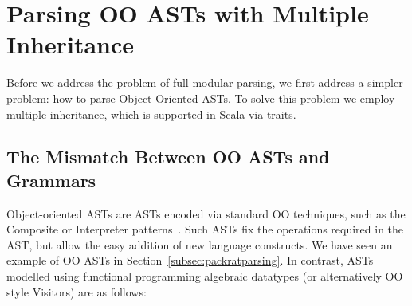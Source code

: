 \begin{comment}
Basically, \name consists of four parts: underlying parsing technique, delegation mechanism encoded by open recursion, Object Algebras, and glue code of new combinators and utility functions. We start from Section \ref{subsec:overview-parsing}, which discusses the choice of parsing technique and how it affects modularity of parsers. Section \ref{subsec:overview-problem} demonstrates the goal of extending parsers together with ASTs in a semantic modular way, with both separate compilation and type-safe code reuse. Then we will see traditional parser combinators fail to achieve it because of hard-coded recursive calls. In Section \ref{subsec:overview-delegation}, we show how delegation can solve this problem and allow us to build extensible parsers. Finally, Section \ref{subsec:overview-oa} gives examples of using Object Algebras for more extensibility, including extension of operations and parsing multiple sorts of syntax.\haoyuan{TODO}
\end{comment}

\begin{comment}
It is worth mentioning that the choice of parser combinators will not
affect the other parts of our library. One can choose other parser
combinators like Parsec, in cases that the performance and supporting
of left-recursion are not major concerns. A different library can even build a new
\name with fancy features or higher efficiency.
\end{comment}


\section{Parsing OO ASTs with Multiple Inheritance}\label{sec:inheritance}

Before we address the problem of full modular parsing, we first
address a simpler problem: how to parse Object-Oriented ASTs. To solve
this problem we employ multiple inheritance, which is supported in
Scala via traits.

\subsection{The Mismatch Between OO ASTs and Grammars}\label{subsec:mismatch}
Object-oriented ASTs are ASTs encoded via standard OO techniques,
such as the {\sc Composite} or {\sc Interpreter} patterns~\cite{gamma1995design}. Such ASTs
fix the operations required in the AST, but allow the easy addition of new
language constructs. We have seen an example of OO ASTs in Section~\ref{subsec:packratparsing}.
In contrast, ASTs modelled using functional programming algebraic datatypes (or alternatively OO style Visitors) are as follows:

